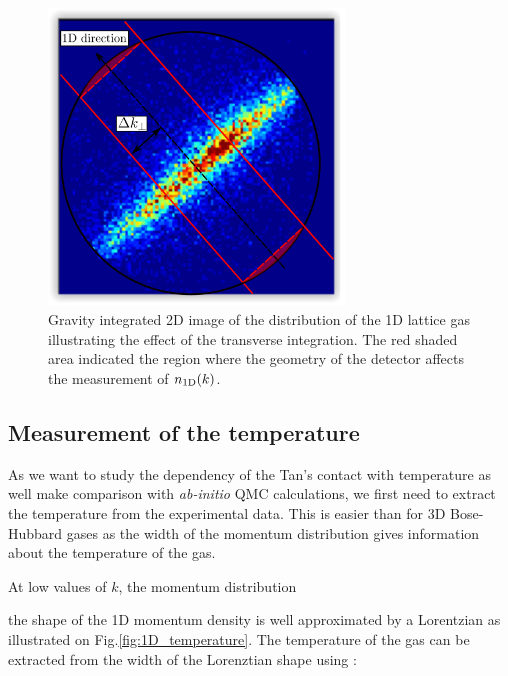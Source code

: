 \begin{figure}
    \centering
    \includegraphics[width=0.7\textwidth]{Fig/Chapter5/1D_transverse_integration.png}
    \caption{Gravity integrated 2D image of the distribution of the 1D lattice gas illustrating the effect of the transverse integration. The red shaded area indicated the region where the geometry of the detector affects the measurement of $n_{\rm{1D}} (k)$.}
    \label{fig:1D_integration}
\end{figure}

\subsection{Measurement of the temperature}

\label{sec:1D_temperature}

As we want to study the dependency of the Tan's contact with temperature as well make comparison with {\it ab-initio} QMC calculations, we first need to extract the temperature from the experimental data. This is easier than for 3D Bose-Hubbard gases as the width of the momentum distribution gives information about the temperature of the gas. 






At low values of $k$, the momentum distribution 


the shape of the 1D momentum density is well approximated by a Lorentzian \cite{cazalilla2004bosonizing,gerbier2004condensat} as illustrated on Fig.\ref{fig:1D_temperature}. The temperature of the gas can be extracted from the width of the Lorenztian shape using \cite{fabbri2011momentum}:

